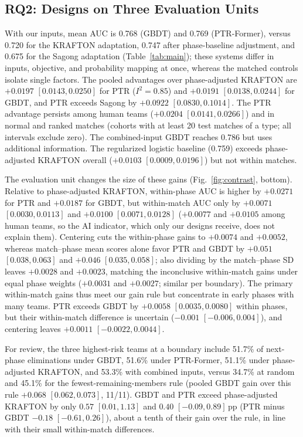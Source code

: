 \documentclass[sigconf,anonymous,nonacm]{acmart}
\begin{document}
\subsection{RQ2: Designs on Three Evaluation Units}
\label{sec:results:rq2}

With our inputs, mean AUC is 0.768 (GBDT) and 0.769 (PTR-Former), versus 0.720 for the KRAFTON adaptation, 0.747 after phase-baseline adjustment, and 0.675 for the Sagong adaptation (Table~\ref{tab:main}); these systems differ in inputs, objective, and probability mapping at once, whereas the matched controls isolate single factors. The pooled advantages over phase-adjusted KRAFTON are $+0.0197$ $[0.0143,\allowbreak 0.0250]$ for PTR ($I^2=0.85$) and $+0.0191$ $[0.0138,\allowbreak 0.0244]$ for GBDT, and PTR exceeds Sagong by $+0.0922$ $[0.0830,\allowbreak 0.1014]$. The PTR advantage persists among human teams ($+0.0204$ $[0.0141,\allowbreak 0.0266]$) and in normal and ranked matches (cohorts with at least 20 test matches of a type; all intervals exclude zero). The combined-input GBDT reaches 0.786 but uses additional information. The regularized logistic baseline (0.759) exceeds phase-adjusted KRAFTON overall ($+0.0103$ $[0.0009,\allowbreak 0.0196]$) but not within matches.

The evaluation unit changes the size of these gains (Fig.~\ref{fig:contrast}, bottom). Relative to phase-adjusted KRAFTON, within-phase AUC is higher by $+0.0271$ for PTR and $+0.0187$ for GBDT, but within-match AUC only by $+0.0071$ $[0.0030,\allowbreak 0.0113]$ and $+0.0100$ $[0.0071,\allowbreak 0.0128]$ ($+0.0077$ and $+0.0105$ among human teams, so the AI indicator, which only our designs receive, does not explain them). Centering cuts the within-phase gains to $+0.0074$ and $+0.0052$, whereas match--phase mean scores alone favor PTR and GBDT by $+0.051$ $[0.038,\allowbreak 0.063]$ and $+0.046$ $[0.035,\allowbreak 0.058]$; also dividing by the match--phase SD leaves $+0.0028$ and $+0.0023$, matching the inconclusive within-match gains under equal phase weights ($+0.0031$ and $+0.0027$; similar per boundary). The primary within-match gains thus meet our gain rule but concentrate in early phases with many teams. PTR exceeds GBDT by $+0.0058$ $[0.0035,\allowbreak 0.0080]$ within phases, but their within-match difference is uncertain ($-0.001$ $[-0.006,\allowbreak 0.004]$), and centering leaves $+0.0011$ $[-0.0022,\allowbreak 0.0044]$.

For review, the three highest-risk teams at a boundary include 51.7\% of next-phase eliminations under GBDT, 51.6\% under PTR-Former, 51.1\% under phase-adjusted KRAFTON, and 53.3\% with combined inputs, versus 34.7\% at random and 45.1\% for the fewest-remaining-members rule (pooled GBDT gain over this rule $+0.068$ $[0.062,\allowbreak 0.073]$, 11/11). GBDT and PTR exceed phase-adjusted KRAFTON by only $0.57$ $[0.01,\allowbreak 1.13]$ and $0.40$ $[-0.09,\allowbreak 0.89]$\,pp (PTR minus GBDT $-0.18$ $[-0.61,\allowbreak 0.26]$), about a tenth of their gain over the rule, in line with their small within-match differences.
\end{document}
